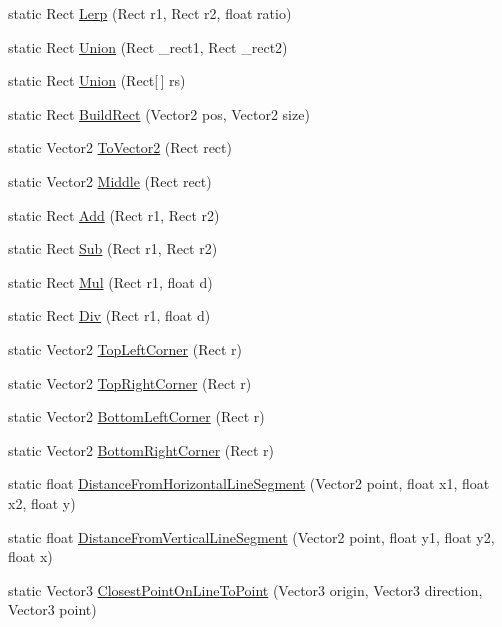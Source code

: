 \begin{DoxyCompactItemize}
\item 
static Rect \hyperlink{class_math3_d_a785b34658dd8a83db3d4ada5e1aac03a}{Lerp} (Rect r1, Rect r2, float ratio)
\item 
static Rect \hyperlink{class_math3_d_a5985254102f669d21c2f730f4b4bb344}{Union} (Rect \+\_\+rect1, Rect \+\_\+rect2)
\item 
static Rect \hyperlink{class_math3_d_a945e15ffc430f40edd8ed424797deb48}{Union} (Rect\mbox{[}$\,$\mbox{]} rs)
\item 
static Rect \hyperlink{class_math3_d_a1bd6784a08b411fee41bc15cb1527ee2}{Build\+Rect} (Vector2 pos, Vector2 size)
\item 
static Vector2 \hyperlink{class_math3_d_a3f63c9d7dc3b0a744ada2d2a70f467b7}{To\+Vector2} (Rect rect)
\item 
static Vector2 \hyperlink{class_math3_d_afbc8f9642a82726ee69a6ca219e525f5}{Middle} (Rect rect)
\item 
static Rect \hyperlink{class_math3_d_a12c609ed749b1de00e06f27c7c7cab73}{Add} (Rect r1, Rect r2)
\item 
static Rect \hyperlink{class_math3_d_a482bbe11234f2d1da3213ce4ad7d56dd}{Sub} (Rect r1, Rect r2)
\item 
static Rect \hyperlink{class_math3_d_a33c798ce0c494f4b7690ee2a76a96587}{Mul} (Rect r1, float d)
\item 
static Rect \hyperlink{class_math3_d_a90e82794397e48790a991faff30521c4}{Div} (Rect r1, float d)
\item 
static Vector2 \hyperlink{class_math3_d_a6b3ac76b5fced02495af78a8b1e35dc6}{Top\+Left\+Corner} (Rect r)
\item 
static Vector2 \hyperlink{class_math3_d_a982dc76e5c963e1558b21fbce9a683b7}{Top\+Right\+Corner} (Rect r)
\item 
static Vector2 \hyperlink{class_math3_d_ae7dfc9ce43eb1dc971672c32da226436}{Bottom\+Left\+Corner} (Rect r)
\item 
static Vector2 \hyperlink{class_math3_d_a5cb8296142f808f214ced2efd992bd8d}{Bottom\+Right\+Corner} (Rect r)
\item 
static float \hyperlink{class_math3_d_a2ad714b56a9b6ca340345fa2fcfa815b}{Distance\+From\+Horizontal\+Line\+Segment} (Vector2 point, float x1, float x2, float y)
\item 
static float \hyperlink{class_math3_d_ad9b83e6ce0ab784877190df4b73a13d2}{Distance\+From\+Vertical\+Line\+Segment} (Vector2 point, float y1, float y2, float x)
\item 
static Vector3 \hyperlink{class_math3_d_a1a7e191988b417d47949c834cd502164}{Closest\+Point\+On\+Line\+To\+Point} (Vector3 origin, Vector3 direction, Vector3 point)

\end{DoxyCompactItemize}
